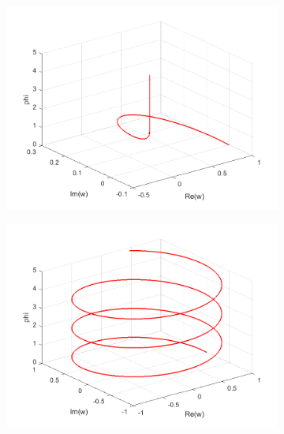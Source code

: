 \documentclass[a4paper,11pt]{article}
\begin{document}
\begin{figure}[!h]
\begin{subfigure}[c]{0.3\textwidth}
\end{subfigure}
\begin{subfigure}[c]{0.3\textwidth}
\includegraphics[width=\linewidth]{plot7_musg22.png}
\end{subfigure}
\begin{subfigure}[c]{0.3\textwidth}
\includegraphics[width=\linewidth]{plot7_musg30.png}
\end{subfigure}
\begin{subfigure}[c]{0.3\textwidth}

\end{subfigure}
\end{figure}
\end{document}
